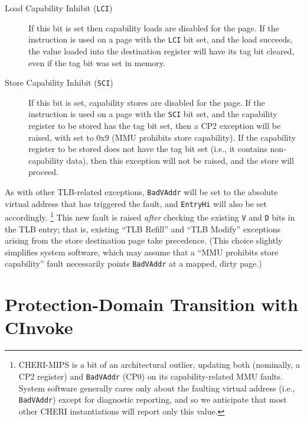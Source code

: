 \begin{description}
\item[Load Capability Inhibit (\texttt{LCI})] If this bit is set then capability
  loads are disabled for the page.
  If the  instruction is used on a page with the \texttt{LCI}
  bit set, and the load succeeds, the value loaded into the destination
  register will have its tag bit cleared, even if the tag bit was set in
  memory.

\item[Store Capability Inhibit (\texttt{SCI})] If this bit is set, capability
  stores are disabled for the page.
  If the  instruction is used on a page with the \texttt{SCI}
  bit set, and the capability register to be stored has the tag bit set, then
  a CP2 exception will be raised, with \capcausereg{} set to 0x9 (MMU
  prohibits store capability).
  If the capability register to be stored does not have the tag bit set (i.e.,
  it contains non-capability data), then this exception will not be raised,
  and the store will proceed.
\end{description}

\noindent
%
As with other TLB-related exceptions, \texttt{BadVAddr} will be set to the
absolute virtual address that has triggered the fault, and \texttt{EntryHi}
will also be set accordingly.%
%
\footnote{CHERI-MIPS is a bit of an architectural outlier, updating both
\capcausereg{} (nominally, a CP2 register) and \texttt{BadVAddr} (CP0) on its
capability-related MMU faults.  System software generally cares only about the
faulting virtual address (i.e., \texttt{BadVAddr}) except for diagnostic
reporting, and so we anticipate that most other CHERI instantiations will
report only this value.}
%
This new fault is raised \emph{after} checking
the existing \texttt{V} and \texttt{D} bits in the TLB entry; that is, existing
``TLB Refill'' and ``TLB Modify'' exceptions arising from the store destination
page take precedence.  (This choice slightly simplifies system software, which
may assume that a ``MMU prohibits store capability'' fault necessarily points
\texttt{BadVAddr} at a mapped, dirty page.)

\section{Protection-Domain Transition with CInvoke}
\label{section:protection-domain-transition-with-cinvoke}


